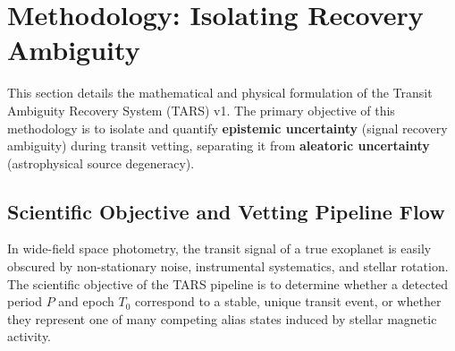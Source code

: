 \section{Methodology: Isolating Recovery Ambiguity} \label{sec:methodology}

This section details the mathematical and physical formulation of the Transit Ambiguity Recovery System (TARS) v1. The primary objective of this methodology is to isolate and quantify \textbf{epistemic uncertainty} (signal recovery ambiguity) during transit vetting, separating it from \textbf{aleatoric uncertainty} (astrophysical source degeneracy).

\subsection{Scientific Objective and Vetting Pipeline Flow} \label{sec:method_pipeline_flow}
In wide-field space photometry, the transit signal of a true exoplanet is easily obscured by non-stationary noise, instrumental systematics, and stellar rotation. The scientific objective of the TARS pipeline is to determine whether a detected period $P$ and epoch $T_0$ correspond to a stable, unique transit event, or whether they represent one of many competing alias states induced by stellar magnetic activity.

